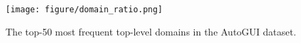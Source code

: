 \begin{figure}[ht]
    \centering
    \texttt{[image: figure/domain\_ratio.png]}
    \caption{The top-50 most frequent top-level domains in the AutoGUI dataset.}
    \label{fig: domain ratio}
\end{figure}

